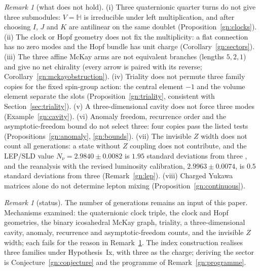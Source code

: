 \documentclass[aps,pra,onecolumn,superscriptaddress,nofootinbib,10pt]{revtex4-2}
\theoremstyle{definition}
\theoremstyle{remark}
\newtheorem{remark}[theorem]{Remark}
\newcommand{\HH}{\mathbb{H}}
\begin{document}
\begin{remark}[what does not hold]\label{rem:gnnogo}
(i) Three quaternionic quarter turns do not give three submodules: $V=\HH$ is irreducible under left
multiplication, and after choosing $I$, $J$ and $K$ are antilinear on the same doublet (Proposition~\ref{gn:clocks}).
(ii) The clock or Hopf geometry does not fix the multiplicity: a flat connection has no zero modes and the Hopf
bundle has unit charge (Corollary~\ref{gn:sectors}).  (iii) The three affine McKay arms are not equivalent
branches (lengths $5,2,1$) and give no net chirality (every arrow is paired with its reverse;
Corollary~\ref{gn:mckayobstruction}).  (iv) Triality does not permute three family copies for the fixed spin-group
action: the central element $-1$ and the volume element separate the slots (Proposition~\ref{gn:triality},
consistent with Section~\ref{sec:triality}).  (v) A three-dimensional cavity does not force three modes
(Example~\ref{gn:cavity}).  (vi) Anomaly freedom, recurrence order and the asymptotic-freedom bound do not select
three: four copies pass the listed tests (Propositions~\ref{gn:anomaly}, \ref{gn:bounds}).  (vii) The invisible
$Z$ width does not count all generations: a state without $Z$ coupling does not contribute, and the LEP/SLD value
$N_\nu=2.9840\pm0.0082$ is $1.95$ standard deviations from three \cite{gn:lepsource}, and the reanalysis with the revised
luminosity calibration, $2.9963\pm0.0074$, is $0.5$ standard deviations from three \cite{gn:janot} (Remark~\ref{gn:lep}).  (viii) Charged
Yukawa matrices alone do not determine lepton mixing (Proposition~\ref{gn:continuous}).
\end{remark}

\begin{remark}[status]\label{rem:gnstatus}
The number of generations remains an input of this paper.  Mechanisms examined: the quaternionic clock
triple, the clock and Hopf geometries, the binary icosahedral McKay graph, triality, a three-dimensional
cavity, anomaly, recurrence and asymptotic-freedom counts, and the invisible $Z$ width; each fails for the
reason in Remark~\ref{rem:gnnogo}.  The index construction realises three families under Hypothesis~Ix, with
three as the charge; deriving the sector is Conjecture~\ref{gn:conjecture} and the programme of
Remark~\ref{gn:programme}.
\end{remark}

\end{document}
